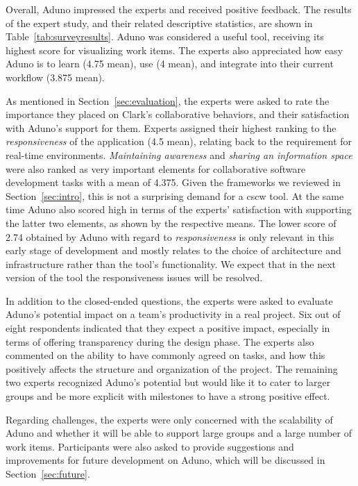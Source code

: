 \documentclass[conference]{IEEEtran}
\begin{document}
Overall, Aduno impressed the experts and received positive feedback. The results of the expert study, and their related descriptive statistics, are shown in Table~\ref{tab:surveyresults}. 
Aduno was considered a useful tool, receiving its highest score for visualizing work items. The experts also appreciated how easy Aduno is to learn (4.75 mean), use (4 mean), and integrate into their current workflow (3.875 mean).

As mentioned in Section~\ref{sec:evaluation}, the experts were asked to rate the importance they placed on Clark's \cite{Clark96} collaborative behaviors, and their satisfaction with Aduno's support for them. Experts assigned their highest ranking to the \textit{responsiveness} of the application (4.5 mean), relating back to the requirement for real-time environments. \textit{Maintaining awareness} and \textit{sharing an information space} were also ranked as very important elements for collaborative software development tasks with a mean of 4.375. Given the frameworks we reviewed in Section~\ref{sec:intro}, this is not a surprising demand for a {\sc cscw} tool. At the same time Aduno also scored high in terms of the experts' satisfaction with supporting the latter two elements, as shown by the respective means. The lower score of 2.74 obtained by Aduno with regard to \textit{responsiveness} is only relevant in this early stage of development and mostly relates to the choice of architecture and infrastructure rather than the tool's functionality. We expect that in the next version of the tool the responsiveness issues will be resolved. 


In addition to the closed-ended questions, the experts were asked to evaluate Aduno's potential impact on a team's productivity in a real project. Six out of eight respondents indicated that they expect a positive impact, especially in terms of offering transparency during the design phase. The experts also commented on the ability to have commonly agreed on tasks, and how this positively affects the structure and organization of the project. The remaining two experts recognized Aduno's potential but would like it to cater to larger groups and be more explicit with milestones to have a strong positive effect.

Regarding challenges, the experts were only concerned with the scalability of Aduno and whether it will be able to support large groups and a large number of work items. Participants were also asked to provide suggestions and improvements for future development on Aduno, which will be discussed in Section~\ref{sec:future}.
\end{document}
